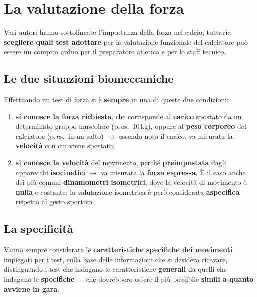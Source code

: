 \section{La valutazione della forza}

Vari autori hanno sottolineato l'importanza della forza nel calcio; tuttavia \textbf{scegliere quali
test adottare} per la valutazione funzionale del calciatore può essere un compito arduo per il
preparatore atletico e per lo staff tecnico.

\subsection{Le due situazioni biomeccaniche}

Effettuando un test di forza si è \textbf{sempre} in una di queste due condizioni:

\begin{enumerate}
  \item \textbf{si conosce la forza richiesta}, che corrisponde al \textbf{carico} spostato da un
    determinato gruppo muscolare (p.\,es.\ 10\,kg), oppure al \textbf{peso corporeo} del calciatore
    (p.\,es.\ in un salto) $\rightarrow$ essendo noto il carico, va misurata la \textbf{velocità} con
    cui viene spostato;
  \item \textbf{si conosce la velocità} del movimento, perché \textbf{preimpostata} dagli apparecchi
    \textbf{isocinetici} $\rightarrow$ va misurata la \textbf{forza espressa}. È il caso anche dei
    più comuni \textbf{dinamometri isometrici}, dove la velocità di movimento è \textbf{nulla} e
    costante; la valutazione isometrica è però considerata \textbf{aspecifica} rispetto al gesto
    sportivo.
\end{enumerate}

\subsection{La specificità}

Vanno sempre considerate le \textbf{caratteristiche specifiche dei movimenti} impiegati per i test,
sulla base delle informazioni che si desidera ricavare, distinguendo i test che indagano le
caratteristiche \textbf{generali} da quelli che indagano le \textbf{specifiche} --- che dovrebbero
essere il più possibile \textbf{simili a quanto avviene in gara}.


